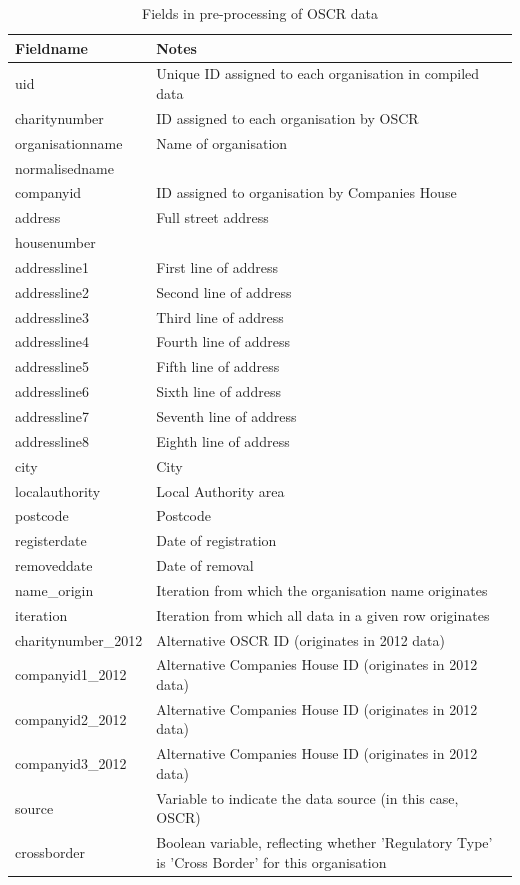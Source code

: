 \documentclass{article}
\begin{document}
\begin{table}[h]
  \centering
  \begin{tabularx}{\textwidth}{|l|X|}
    \hline
    Fieldname  &	Notes \\
    \hline \hline
uid & Unique ID assigned to each organisation in compiled data \\ \hline
charitynumber & ID assigned to each organisation by OSCR \\ \hline
organisationname & Name of organisation \\ \hline
normalisedname & \\ \hline
companyid & ID assigned to organisation by Companies House \\ \hline
address & Full street address \\ \hline
housenumber & \\ \hline
addressline1 & First line of address \\ \hline
addressline2 & Second line of address \\ \hline
addressline3 & Third line of address \\ \hline
addressline4 & Fourth line of address \\ \hline
addressline5 & Fifth line of address \\ \hline
addressline6 & Sixth line of address \\ \hline
addressline7 & Seventh line of address \\ \hline
addressline8 & Eighth line of address \\ \hline
city & City \\ \hline
localauthority & Local Authority area \\ \hline
postcode & Postcode \\ \hline
registerdate & Date of registration \\ \hline
removeddate & Date of removal \\ \hline
name\_origin & Iteration from which the organisation name originates \\ \hline
iteration & Iteration from which all data in a given row originates \\ \hline
charitynumber\_2012 & Alternative OSCR ID (originates in 2012 data) \\ \hline
companyid1\_2012 & Alternative Companies House ID (originates in 2012 data) \\ \hline
companyid2\_2012 & Alternative Companies House ID (originates in 2012 data) \\ \hline
companyid3\_2012 & Alternative Companies House ID (originates in 2012 data) \\ \hline
source & Variable to indicate the data source (in this case, OSCR) \\ \hline
crossborder & Boolean variable, reflecting whether 'Regulatory Type' is 'Cross Border' for this organisation \\ \hline
\end{tabularx}
\caption{Fields in pre-processing of OSCR data}
\label{tab:oscr_preprocess}
\end{table}
\end{document}
